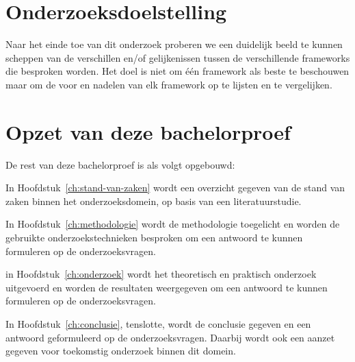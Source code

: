 \section{Onderzoeksdoelstelling}
\label{sec:onderzoeksdoelstelling}

Naar het einde toe van dit onderzoek proberen we een duidelijk beeld te kunnen scheppen van de verschillen en/of gelijkenissen tussen de verschillende frameworks die besproken worden. Het doel is niet om één framework als beste te beschouwen maar om de voor en nadelen van elk framework op te lijsten en te vergelijken.

\section{Opzet van deze bachelorproef}
\label{sec:opzet-bachelorproef}


De rest van deze bachelorproef is als volgt opgebouwd:

In Hoofdstuk~\ref{ch:stand-van-zaken} wordt een overzicht gegeven van de stand van zaken binnen het onderzoeksdomein, op basis van een literatuurstudie.

In Hoofdstuk~\ref{ch:methodologie} wordt de methodologie toegelicht en worden de gebruikte onderzoekstechnieken besproken om een antwoord te kunnen formuleren op de onderzoeksvragen.


in Hoofdstuk~\ref{ch:onderzoek} wordt het theoretisch en praktisch onderzoek uitgevoerd en worden de resultaten weergegeven om een antwoord te kunnen formuleren op de onderzoeksvragen. 

In Hoofdstuk~\ref{ch:conclusie}, tenslotte, wordt de conclusie gegeven en een antwoord geformuleerd op de onderzoeksvragen. Daarbij wordt ook een aanzet gegeven voor toekomstig onderzoek binnen dit domein.

